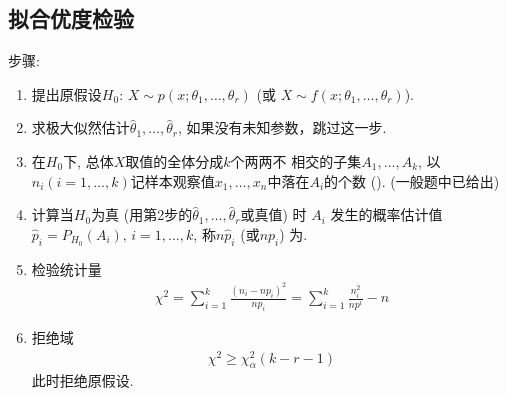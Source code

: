 \subsection{拟合优度检验}
步骤:
\begin{enumerate}
    \item 提出原假设$H_0: \, X\sim p(x;\theta_1,\dots,\theta_r)$ (或 $X\sim f(x;\theta_1,\dots,\theta_r)$). 
    \item 求极大似然估计$\hat{\theta}_1,\dots,\hat{\theta}_r$, 如果没有未知参数，跳过这一步. 
    \item 在$H_0$下, 总体$X$取值的全体分成$k$个两两不
    相交的子集$A_1,\dots,A_k$, 以$n_i(i=1,\dots,k)$记样本观察值$x_1,\dots,x_n$中落在$A_i$的个数 (). (一般题中已给出)
    \item 计算当$H_0$为真 (用第2步的$\hat{\theta}_1,\dots,\hat{\theta}_r$或真值) 时 $A_i$ 发生的概率估计值 $\hat{p}_i=P_{H_0}(A_i),\,i=1,\dots,k$, 称$n\hat{p}_i$ (或$np_i$) 为.\\
    \item 检验统计量
    \begin{align*}
        \chi^2=\sum_{i=1}^k\frac{(n_i-np_i)^2}{np_i}=\sum_{i=1}^k \frac{n_i^2}{np^i}-n
    \end{align*}
    \item 拒绝域
    \begin{align*}
        \chi^2\ge \chi_{\alpha}^2(k-r-1)
    \end{align*}
    此时拒绝原假设. 
\end{enumerate}